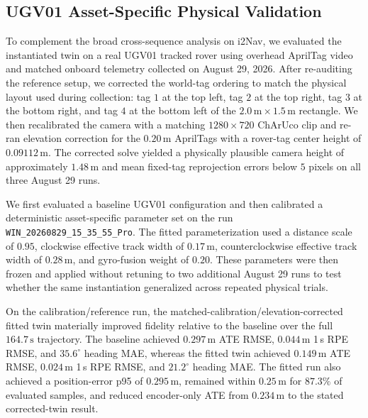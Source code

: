 \subsection{UGV01 Asset-Specific Physical Validation}
\label{subsec:ugv01-physical-validation}

To complement the broad cross-sequence analysis on i2Nav, we evaluated the
instantiated twin on a real UGV01 tracked rover using overhead AprilTag video
and matched onboard telemetry collected on August 29, 2026. After re-auditing
the reference setup, we corrected the world-tag ordering to match the physical
layout used during collection: tag $1$ at the top left, tag $2$ at the top
right, tag $3$ at the bottom right, and tag $4$ at the bottom left of the
$2.0\,\mathrm{m}\times1.5\,\mathrm{m}$ rectangle. We then recalibrated the
camera with a matching $1280\times720$ ChArUco clip and re-ran elevation
correction for the $0.20\,\mathrm{m}$ AprilTags with a rover-tag center height
of $0.09112\,\mathrm{m}$. The corrected solve yielded a physically plausible
camera height of approximately $1.48\,\mathrm{m}$ and mean fixed-tag
reprojection errors below $5$ pixels on all three August 29 runs.

We first evaluated a baseline UGV01 configuration and then calibrated a
deterministic asset-specific parameter set on the run
\texttt{WIN\_20260829\_15\_35\_55\_Pro}. The fitted parameterization used a
distance scale of $0.95$, clockwise effective track width of $0.17\,\mathrm{m}$,
counterclockwise effective track width of $0.28\,\mathrm{m}$, and gyro-fusion
weight of $0.20$. These parameters were then frozen and applied without
retuning to two additional August 29 runs to test whether the same
instantiation generalized across repeated physical trials.

On the calibration/reference run, the matched-calibration/elevation-corrected
fitted twin materially improved fidelity relative to the baseline over the full
$164.7\,\mathrm{s}$ trajectory. The baseline achieved $0.297\,\mathrm{m}$ ATE
RMSE, $0.044\,\mathrm{m}$ 1\,s RPE RMSE, and $35.6^\circ$ heading MAE, whereas
the fitted twin achieved $0.149\,\mathrm{m}$ ATE RMSE, $0.024\,\mathrm{m}$ 1\,s
RPE RMSE, and $21.2^\circ$ heading MAE. The fitted run also achieved a
position-error p95 of $0.295\,\mathrm{m}$, remained within $0.25\,\mathrm{m}$
for $87.3\%$ of evaluated samples, and reduced encoder-only ATE from
$0.234\,\mathrm{m}$ to the stated corrected-twin result.

